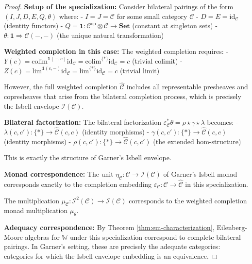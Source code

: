 \documentclass[11pt]{article}
\theoremstyle{plain}
\theoremstyle{definition}
\theoremstyle{remark}
\newcommand{\C}{\mathcal{C}}
\newcommand{\op}{\mathrm{op}}
\newcommand{\id}{\mathrm{id}}
\newcommand{\colim}{\mathrm{colim}}
\renewcommand{\lim}{\mathrm{lim}}
\newcommand{\wh}[1]{\widehat{#1}}
\begin{document}
\begin{proof}
\textbf{Setup of the specialization:}
Consider bilateral pairings of the form $(I, J, D, E, Q, \theta)$ where:
- $I = J = \C$ for some small category $\C$
- $D = E = \id_\C$ (identity functors)
- $Q = \mathbf{1} : \C^{\op} \otimes \C \to \mathbf{Set}$ (constant at singleton sets)
- $\theta : \mathbf{1} \Rightarrow \C(-, -)$ (the unique natural transformation)

\textbf{Weighted completion in this case:}
The weighted completion requires:
- $Y(c) = \colim^{\mathbf{1}(-, c)} \id_\C = \colim^{\{*\}} \id_\C = c$ (trivial colimit)
- $Z(c) = \lim^{\mathbf{1}(c, -)} \id_\C = \lim^{\{*\}} \id_\C = c$ (trivial limit)

However, the full weighted completion $\wh{\C}$ includes all representable presheaves and copresheaves that arise from the bilateral completion process, which is precisely the Isbell envelope $\mathcal{I}(\C)$.

\textbf{Bilateral factorization:}
The bilateral factorization $\varepsilon_\C^* \theta = \rho \star \gamma \star \lambda$ becomes:
- $\lambda(c, c') : \{*\} \to \wh{\C}(c, c)$ (identity morphisms)
- $\gamma(c, c') : \{*\} \to \wh{\C}(c, c)$ (identity morphisms)  
- $\rho(c, c') : \{*\} \to \wh{\C}(c, c')$ (the extended hom-structure)

This is exactly the structure of Garner's Isbell envelope.

\textbf{Monad correspondence:}
The unit $\eta_\C : \C \to \mathcal{I}(\C)$ of Garner's Isbell monad corresponds exactly to the completion embedding $\varepsilon_\C : \C \to \wh{\C}$ in this specialization.

The multiplication $\mu_\C : \mathcal{I}^2(\C) \to \mathcal{I}(\C)$ corresponds to the weighted completion monad multiplication $\mu_\theta$.

\textbf{Adequacy correspondence:}
By Theorem \ref{thm:em-characterization}, Eilenberg-Moore algebras for $\mathbb{W}$ under this specialization correspond to complete bilateral pairings. In Garner's setting, these are precisely the adequate categories: categories for which the Isbell envelope embedding is an equivalence.
\end{proof}
\end{document}
